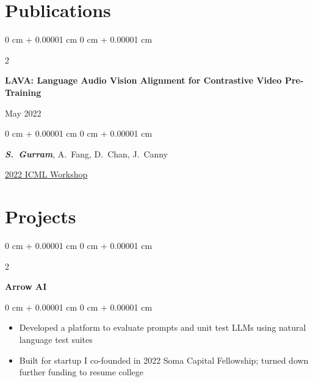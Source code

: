 \documentclass[10pt, letterpaper]{article}
\newenvironment{highlights}{
    \begin{itemize}[
        topsep=0.10 cm,
        parsep=0.10 cm,
        partopsep=0pt,
        itemsep=0pt,
        leftmargin=0 cm + 10pt
    ]
}{
    \end{itemize}
} %
\newenvironment{onecolentry}{
    \begin{adjustwidth}{
        0 cm + 0.00001 cm
    }{
        0 cm + 0.00001 cm
    }
}{
    \end{adjustwidth}
} %
\newenvironment{twocolentry}[2][]{
    \onecolentry
    \def\secondColumn{#2}
    \setcolumnwidth{\fill, 4.5 cm}
    \begin{paracol}{2}
}{
    \switchcolumn \raggedleft \secondColumn
    \end{paracol}
    \endonecolentry
} %
\begin{document}
    \section{Publications}
        \begin{samepage}
            \begin{twocolentry}{
                May 2022
            }
                \textbf{LAVA: Language Audio Vision Alignment for Contrastive Video Pre-Training}
            \end{twocolentry}

            \vspace{0.10 cm}
            
            \begin{onecolentry}
                \mbox{\textbf{\textit{S. Gurram}}}, \mbox{A. Fang}, \mbox{D. Chan}, \mbox{J. Canny}
                \vspace{0.10 cm}
                
        \href{https://arxiv.org/abs/2207.08024}{2022 ICML Workshop}
        \end{onecolentry}
        \end{samepage}

        \vspace{0.3 cm}

    
    \section{Projects}



        
        \begin{twocolentry}{
        }
            \textbf{Arrow AI}\end{twocolentry}

        \vspace{0.10 cm}
        \begin{onecolentry}
            \begin{highlights}
                \item Developed a platform to evaluate prompts and unit test LLMs using natural language test suites
                \item Built for startup I co-founded in 2022 Soma Capital Fellowship; turned down further funding to resume college
            \end{highlights}
        \end{onecolentry}

        \vspace{0.3 cm}
\end{document}
